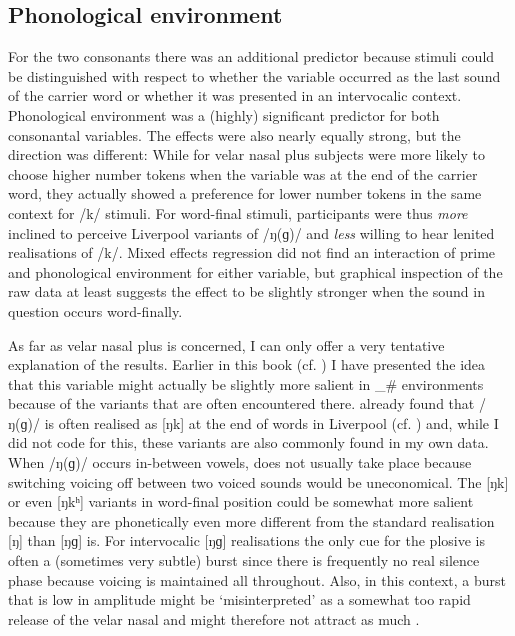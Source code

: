 		\subsection{Phonological environment}

For the two consonants there was an additional predictor because stimuli could be distinguished with respect to whether the variable occurred as the last sound of the carrier word or whether it was presented in an intervocalic context.
Phonological environment was a (highly) significant predictor for both consonantal variables.
The effects were also nearly equally strong, but the direction was different: While for velar nasal plus subjects were more likely to choose higher number tokens when the variable was at the end of the carrier word, they actually showed a preference for lower number tokens in the same context for /k/ stimuli.
For word-final stimuli, participants were thus \emph{more} inclined to perceive Liverpool variants of /ŋ(ɡ)/ and \emph{less} willing to hear lenited realisations of /k/.
Mixed effects regression did not find an interaction of prime and phonological environment for either variable, but graphical inspection of the raw data at least suggests the  effect to be slightly stronger when the sound in question occurs word-finally.

\newpage 
As far as velar nasal plus is concerned, I can only offer a very tentative explanation of the results.
Earlier in this book (cf. ) I have presented the idea that this variable might actually be slightly more salient in \_\# environments because of the variants that are often encountered there.
\textcite{knowles1973} already found that /ŋ(ɡ)/ is often realised as [ŋk] at the end of words in Liverpool (cf. ) and, while I did not code for this, these variants are also commonly found in my own data.
When /ŋ(ɡ)/ occurs in-between vowels,  does not usually take place because switching voicing off between two voiced sounds would be uneconomical.
The [ŋk] or even [ŋkʰ] variants in word-final position could be somewhat more salient because they are phonetically even more different from the standard realisation [ŋ] than [ŋɡ] is.
For intervocalic [ŋɡ] realisations the only cue for the plosive is often a (sometimes very subtle) burst since there is frequently no real silence phase because voicing is maintained all throughout.
Also, in this context, a burst that is low in amplitude might be `misinterpreted' as a somewhat too rapid release of the velar nasal and might therefore not attract as much .

